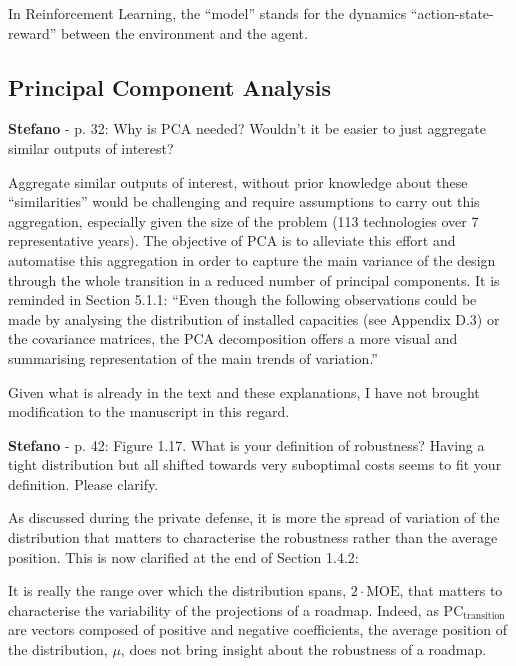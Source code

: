 \documentclass[12pt,a4paper]{article}
\begin{document}
\begin{mdframed}[style=manuscript] %
In Reinforcement Learning, the ``model'' stands for the dynamics ``action-state-reward'' between the environment and the agent. 
\end{mdframed}


\subsection{Principal Component Analysis}
\label{methodo_PCA}

\begin{mdframed}[style=comment] %
{\color{orange} \textbf{Stefano}} - p. 32: Why is PCA needed? Wouldn’t it be easier to just aggregate similar outputs of interest?
\end{mdframed}

\noindent Aggregate similar outputs of interest, without prior knowledge about these ``similarities'' would be challenging and require assumptions to carry out this aggregation, especially given the size of the problem (113 technologies over 7 representative years). The objective of PCA is to alleviate this effort and automatise this aggregation in order to capture the main variance of the design through the whole transition in a reduced number of principal components. It is reminded in Section 5.1.1: ``Even though the following observations could be made by analysing the distribution of installed capacities (see Appendix D.3) or the covariance matrices, the PCA decomposition offers a more visual and summarising representation of the main trends of variation.''

Given what is already in the text and these explanations, I have not brought modification to the manuscript in this regard.

\begin{mdframed}[style=comment] %
{\color{orange} \textbf{Stefano}} - p. 42: Figure 1.17. What is your definition of robustness? Having a tight distribution but all shifted towards very suboptimal costs seems to fit your definition. Please clarify.
\end{mdframed}

\noindent As discussed during the private defense, it is more the spread of variation of the distribution that matters to characterise the robustness rather than the average position. This is now clarified {\color{blue}at the end of Section 1.4.2}:

\begin{mdframed}[style=manuscript] %
It is really the range over which the distribution spans, $2\cdot \mathrm{MOE}$, that matters to characterise the variability of the projections of a roadmap. Indeed, as $\text{PC}_{\text{transition}}$ are vectors composed of positive and negative coefficients, the average position of the distribution, $\mu$, does not bring insight about the robustness of a roadmap.
\end{mdframed}
\end{document}

